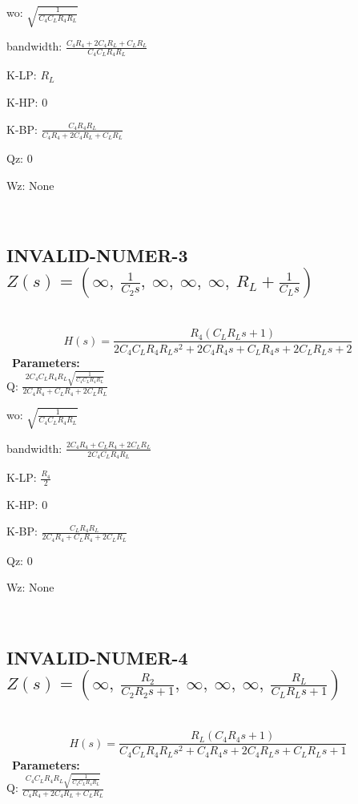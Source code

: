 \documentclass{article}
\begin{document}
wo: $\sqrt{\frac{1}{C_{4} C_{L} R_{4} R_{L}}}$\ 

bandwidth: $\frac{C_{4} R_{4} + 2 C_{4} R_{L} + C_{L} R_{L}}{C_{4} C_{L} R_{4} R_{L}}$\ 

K-LP: $R_{L}$\ 

K-HP: $0$\ 

K-BP: $\frac{C_{4} R_{4} R_{L}}{C_{4} R_{4} + 2 C_{4} R_{L} + C_{L} R_{L}}$\ 

Qz: $0$\ 

Wz: $\text{None}$\ 

\ 

\subsection{INVALID-NUMER-3 $Z(s) = \left( \infty, \  \frac{1}{C_{2} s}, \  \infty, \  \infty, \  \infty, \  R_{L} + \frac{1}{C_{L} s}\right)$ } \ 
\textbf{\[H(s) = \frac{R_{4} \left(C_{L} R_{L} s + 1\right)}{2 C_{4} C_{L} R_{4} R_{L} s^{2} + 2 C_{4} R_{4} s + C_{L} R_{4} s + 2 C_{L} R_{L} s + 2}\] } \ 
\textbf{Parameters:}\\ 

Q: $\frac{2 C_{4} C_{L} R_{4} R_{L} \sqrt{\frac{1}{C_{4} C_{L} R_{4} R_{L}}}}{2 C_{4} R_{4} + C_{L} R_{4} + 2 C_{L} R_{L}}$\ 

wo: $\sqrt{\frac{1}{C_{4} C_{L} R_{4} R_{L}}}$\ 

bandwidth: $\frac{2 C_{4} R_{4} + C_{L} R_{4} + 2 C_{L} R_{L}}{2 C_{4} C_{L} R_{4} R_{L}}$\ 

K-LP: $\frac{R_{4}}{2}$\ 

K-HP: $0$\ 

K-BP: $\frac{C_{L} R_{4} R_{L}}{2 C_{4} R_{4} + C_{L} R_{4} + 2 C_{L} R_{L}}$\ 

Qz: $0$\ 

Wz: $\text{None}$\ 

\ 

\subsection{INVALID-NUMER-4 $Z(s) = \left( \infty, \  \frac{R_{2}}{C_{2} R_{2} s + 1}, \  \infty, \  \infty, \  \infty, \  \frac{R_{L}}{C_{L} R_{L} s + 1}\right)$ } \ 
\textbf{\[H(s) = \frac{R_{L} \left(C_{4} R_{4} s + 1\right)}{C_{4} C_{L} R_{4} R_{L} s^{2} + C_{4} R_{4} s + 2 C_{4} R_{L} s + C_{L} R_{L} s + 1}\] } \ 
\textbf{Parameters:}\\ 

Q: $\frac{C_{4} C_{L} R_{4} R_{L} \sqrt{\frac{1}{C_{4} C_{L} R_{4} R_{L}}}}{C_{4} R_{4} + 2 C_{4} R_{L} + C_{L} R_{L}}$\ 
\end{document}
